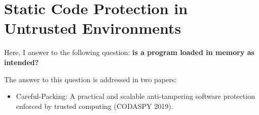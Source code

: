 \chapter{Static Code Protection in Untrusted Environments}
\label{chp:static-protection} 

Here, I answer to the following question: \textbf{is a program loaded in memory 
as intended?}

The answer to this question is addressed in two papers:
\begin{itemize}
	\item Careful-Packing: A practical and scalable anti-tampering software 
	protection enforced by trusted computing (CODASPY 2019).
\end{itemize}
